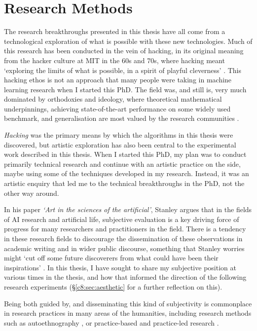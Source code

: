 \section{Research Methods}

The research breakthroughs presented in this thesis have all come from a technological exploration of what is possible with these new technologies. Much of this research has been conducted in the vein of hacking, in its original meaning from the hacker culture at MIT in the 60s and 70s, where hacking meant `exploring the limits of what is possible, in a spirit of playful cleverness' \citep{stallman2002hacking}. 
This hacking ethos is not an approach that many people were taking in machine learning research when I started this PhD. 
The field was, and still is, very much dominated by orthodoxies and ideology, where theoretical mathematical underpinnings, achieving state-of-the-art performance on some widely used benchmark, and generalisation are most valued by the research communities \citep{birhane2022values}.

\textit{Hacking} was the primary means by which the algorithms in this thesis were discovered, but artistic exploration has also been central to the experimental work described in this thesis. 
When I started this PhD, my plan was to conduct primarily technical research and continue with an artistic practice on the side, maybe using some of the techniques developed in my research. 
Instead, it was an artistic enquiry that led me to the technical breakthroughs in the PhD, not the other way around. 

In his paper \textit{`Art in the sciences of the artificial'}, Stanley argues that in the fields of AI research and artificial life, subjective evaluation is a key driving force of progress for many researchers and practitioners in the field. 
There is a tendency in these research fields to discourage the dissemination of these observations in academic writing and in wider public discourse, something that Stanley worries might `cut off some future discoverers from what could have been their inspirations' \citep{stanley2018art}. 
In this thesis, I have sought to share my subjective position at various times in the thesis, and how that informed the direction of the following research experiments (\S \ref{c8:sec:aesthetic} for a further reflection on this).

Being both guided by, and disseminating this kind of subjectivity is commonplace in research practices in many areas of the humanities, including research methods such as autoethnography \citep{reed1997auto}, or practice-based and practice-led research \citep{candy2006practice}. 

